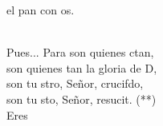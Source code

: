 \begin{cancion}
	el pan con os.\\
	\jumjump\\
	\begin{chorus}%
		Pues... Para  son quienes ctan,\\
		son quienes tan la gloria de D,\\
		son tu stro, Señor, crucifdo,\\
		son tu sto, Señor, resucit. (**)\\
		Eres \jump\\
	\end{chorus}%
\end{cancion}%
